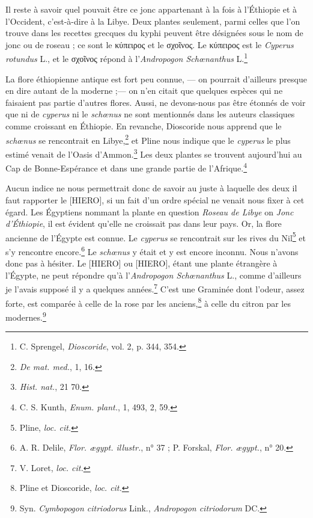 \documentclass[a4paper, 11pt, oneside]{article}
\begin{document}
Il reste à savoir quel pouvait être ce jonc appartenant à la fois à l'Éthiopie et à l'Occident, c'est-à-dire à la Libye. Deux plantes seulement, parmi celles que l'on trouve dans les recettes grecques du kyphi peuvent être désignées sous le nom de jonc ou de roseau ; ce sont le κύπειρος et le σχοῖνος. Le κύπειρος est le \emph{Cyperus rotundus} L., et le σχοῖνος répond à l'\emph{Andropogon Schœnanthus} L.\footnote{C. Sprengel, \emph{Dioscoride}, vol. 2, p. 344, 354.}

La flore éthiopienne antique est fort peu connue, --- on pourrait d'ailleurs presque en dire autant de la moderne ;--- on n'en citait que quelques espèces qui ne faisaient pas partie d'autres flores. Aussi, ne devons-nous pas être étonnés de voir que ni de \emph{cyperus} ni le \emph{schœnus} ne sont mentionnés dans les auteurs classiques comme croissant en Éthiopie. En revanche, Dioscoride nous apprend que le \emph{schœnus} se rencontrait en Libye,\footnote{\emph{De mat. med.}, 1, 16.} et Pline nous indique que le \emph{cyperus} le plus estimé venait de l'Oasis d'Ammon.\footnote{\emph{Hist. nat.}, 21 70.} Les deux plantes se trouvent aujourd'hui au Cap de Bonne-Espérance et dans une grande partie de l'Afrique.\footnote{C. S. Kunth, \emph{Enum. plant.}, 1, 493, 2, 59.}

Aucun indice ne nous permettrait donc de savoir au juste à laquelle des deux il faut rapporter le [HIERO], si un fait d'un ordre spécial ne venait nous fixer à cet égard. Les Égyptiens nommant la plante en question \emph{Roseau de Libye} on \emph{Jonc d'Éthiopie}, il est évident qu'elle ne croissait pas dans leur pays. Or, la flore ancienne de l'Égypte est connue. Le \emph{cyperus} se rencontrait sur les rives du Nil\footnote{Pline, \emph{loc. cit.}} et s'y rencontre encore.\footnote{A. R. Delile, \emph{Flor. ægypt. illustr.}, n° 37 ; P. Forskal, \emph{Flor. ægypt.}, n° 20.} Le \emph{schœnus} y était et y est encore inconnu. Nous n'avons donc pas à hésiter. Le [HIERO] ou [HIERO], étant une plante étrangère à l'Égypte, ne peut répondre qu'à l'\emph{Andropogon Schœnanthus} L., comme d'ailleurs je l'avais supposé il y a quelques années.\footnote{V. Loret, \emph{loc. cit.}} C'est une Graminée dont l'odeur, assez forte, est comparée à celle de la rose par les anciens,\footnote{Pline et Dioscoride, \emph{loc. cit.}} à celle du citron par les modernes.\footnote{Syn. \emph{Cymbopogon citriodorus} Link., \emph{Andropogon citriodorum} DC.}
\end{document}
